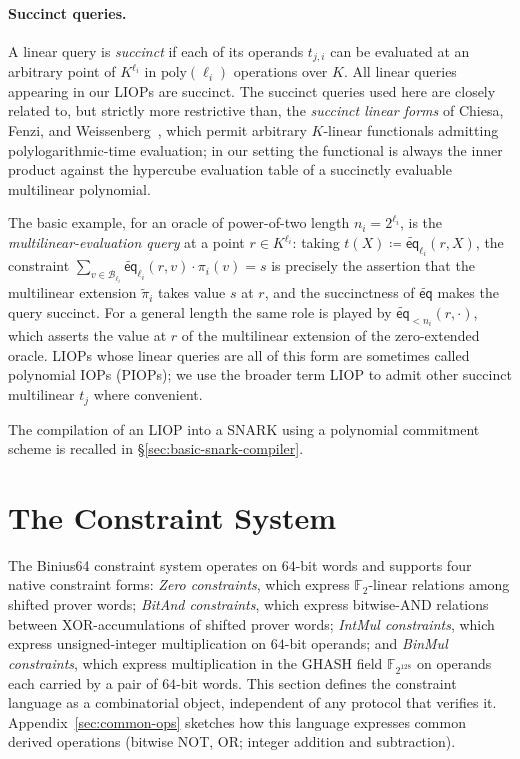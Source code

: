 \documentclass{article}
\theoremstyle{definition}
\newcommand*{\mle}{\widetilde}
\newcommand{\eq}{\mathsf{eq}}
\newcommand{\BB}{\mathcal{B}}
\newcommand{\FF}[1]{\mathbb{F}_{#1}}
\begin{document}
\paragraph{Succinct queries.}
A linear query is \emph{succinct} if each of its operands $t_{j, i}$ can be evaluated at an arbitrary point of $K^{\ell_i}$ in $\text{poly}(\ell_i)$ operations over $K$. All linear queries appearing in our LIOPs are succinct. The succinct queries used here are closely related to, but strictly more restrictive than, the \emph{succinct linear forms} of Chiesa, Fenzi, and Weissenberg~\cite[\S 5]{cryptoeprint:2026/391}, which permit arbitrary $K$-linear functionals admitting polylogarithmic-time evaluation; in our setting the functional is always the inner product against the hypercube evaluation table of a succinctly evaluable multilinear polynomial.

The basic example, for an oracle of power-of-two length $n_i = 2^{\ell_i}$, is the \emph{multilinear-evaluation query} at a point $r \in K^{\ell_i}$: taking $t(X) \coloneqq \mle{\eq}_{\ell_i}(r, X)$, the constraint $\sum_{v \in \BB_{\ell_i}} \mle{\eq}_{\ell_i}(r, v) \cdot \pi_i(v) = s$ is precisely the assertion that the multilinear extension $\mle{\pi}_i$ takes value $s$ at $r$, and the succinctness of $\mle{\eq}$ makes the query succinct. For a general length the same role is played by $\mle{\eq}_{< n_i}(r, \cdot)$, which asserts the value at $r$ of the multilinear extension of the zero-extended oracle. LIOPs whose linear queries are all of this form are sometimes called polynomial IOPs (PIOPs); we use the broader term LIOP to admit other succinct multilinear $t_j$ where convenient.

The compilation of an LIOP into a SNARK using a polynomial commitment scheme is recalled in \S\ref{sec:basic-snark-compiler}.

\section{The Constraint System}
\label{sec:constraint-system}

The Binius64 constraint system operates on $64$-bit words and supports four native constraint forms: \emph{Zero constraints}, which express $\FF{2}$-linear relations among shifted prover words; \emph{BitAnd constraints}, which express bitwise-AND relations between XOR-accumulations of shifted prover words; \emph{IntMul constraints}, which express unsigned-integer multiplication on $64$-bit operands; and \emph{BinMul constraints}, which express multiplication in the GHASH field $\FF{2^{128}}$ on operands each carried by a pair of $64$-bit words. This section defines the constraint language as a combinatorial object, independent of any protocol that verifies it. Appendix~\ref{sec:common-ops} sketches how this language expresses common derived operations (bitwise NOT, OR; integer addition and subtraction).
\end{document}
